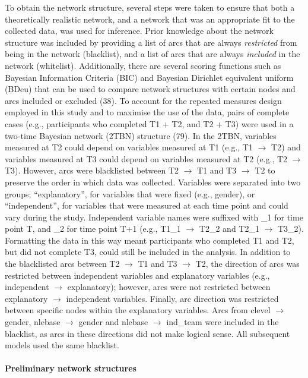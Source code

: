 \documentclass[
  english,
  man]{apa6}
\let\oldparagraph\paragraph
\renewcommand{\paragraph}[1]{\oldparagraph{#1}\mbox{}}
\begin{document}
To obtain the network structure, several steps were taken to ensure that both a theoretically realistic network, and a network that was an appropriate fit to the collected data, was used for inference.
Prior knowledge about the network structure was included by providing a list of arcs that are always \emph{restricted} from being in the network (blacklist), and a list of arcs that are always \emph{included} in the network (whitelist).
Additionally, there are several scoring functions such as Bayesian Information Criteria (BIC) and Bayesian Dirichlet equivalent uniform (BDeu) that can be used to compare network structures with certain nodes and arcs included or excluded (38).
To account for the repeated measures design employed in this study and to maximise the use of the data, pairs of complete cases (e.g., participants who completed T1 + T2, and T2 + T3) were used in a two-time Bayesian network (2TBN) structure (79).
In the 2TBN, variables measured at T2 could depend on variables measured at T1 (e.g., T1 \(\rightarrow\) T2) and variables measured at T3 could depend on variables measured at T2 (e.g., T2 \(\rightarrow\) T3).
However, arcs were blacklisted between T2 \(\rightarrow\) T1 and T3 \(\rightarrow\) T2 to preserve the order in which data was collected.
Variables were separated into two groups; ``explanatory'', for variables that were fixed (e.g., gender), or ``independent'', for variables that were measured at each time point and could vary during the study.
Independent variable names were suffixed with \_1 for time point T, and \_2 for time point T+1 (e.g., T1\_1 \(\rightarrow\) T2\_2 and T2\_1 \(\rightarrow\) T3\_2).
Formatting the data in this way meant participants who completed T1 and T2, but did not complete T3, could still be included in the analysis.
In addition to the blacklisted arcs between T2 \(\rightarrow\) T1 and T3 \(\rightarrow\) T2, the direction of arcs was restricted between independent variables and explanatory variables (e.g., independent \(\rightarrow\) explanatory); however, arcs were not restricted between explanatory \(\rightarrow\) independent variables.
Finally, arc direction was restricted between specific nodes within the explanatory variables.
Arcs from clevel \(\rightarrow\) gender, nlebase \(\rightarrow\) gender and nlebase \(\rightarrow\) ind\_team were included in the blacklist, as arcs in these directions did not make logical sense.
All subsequent models used the same blacklist.

\hypertarget{preliminary-network-structures}{%
\paragraph{Preliminary network structures}\label{preliminary-network-structures}}
\end{document}
